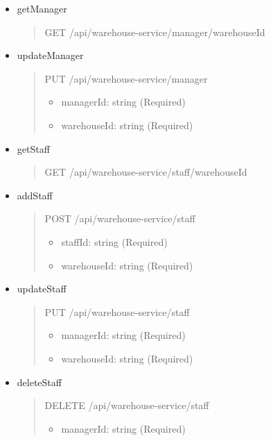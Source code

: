 \begin{itemize}
	\item getManager
	      \begin{quote}
		      GET /api/warehouse-service/manager/{warehouseId}
	      \end{quote}

	\item updateManager
	      \begin{quote}
		      PUT /api/warehouse-service/manager
		      \begin{itemize}
			      \item managerId: string (Required)
			      \item warehouseId: string (Required)
		      \end{itemize}
	      \end{quote}

	\item getStaff
	      \begin{quote}
		      GET /api/warehouse-service/staff/{warehouseId}
	      \end{quote}

	\item addStaff
	      \begin{quote}
		      POST /api/warehouse-service/staff
		      \begin{itemize}
			      \item staffId: string (Required)
			      \item warehouseId: string (Required)
		      \end{itemize}
	      \end{quote}

	\item updateStaff
	      \begin{quote}
		      PUT /api/warehouse-service/staff
		      \begin{itemize}
			      \item managerId: string (Required)
			      \item warehouseId: string (Required)
		      \end{itemize}
	      \end{quote}

	\item deleteStaff
	      \begin{quote}
		      DELETE /api/warehouse-service/staff
		      \begin{itemize}
			      \item managerId: string (Required)
		      \end{itemize}
	      \end{quote}


\end{itemize}
